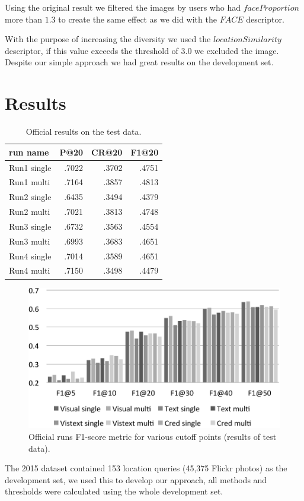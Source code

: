 \documentclass{acm_proc_article-me}
\begin{document}
Using the original result we filtered the images by users who had $faceProportion$ more than $1.3$ to create the same effect as we did with the $FACE$ descriptor.

\pagebreak

With the purpose of increasing the diversity we used the $locationSimilarity$ descriptor, if this value exceeds the threshold of $3.0$ we excluded the image. Despite our simple approach we had great results on the development set.

\section{Results}

\begin{table}[t]
	\centering
\begin{tabular}{|l|r|r|r|}
	\hline 
	run name & P@20 & CR@20 & F1@20\tabularnewline
	\hline 
	\hline 
	Run1 single & .7022 & .3702 & .4751\tabularnewline
	\hline 
	Run1 multi & .7164 & .3857 & .4813\tabularnewline
	\hline 
	Run2 single & .6435 & .3494 & .4379\tabularnewline
	\hline 
	Run2 multi & .7021 & .3813 & .4748\tabularnewline
	\hline 
	Run3 single & .6732 & .3563 & .4554\tabularnewline
	\hline 
	Run3 multi & .6993 & .3683 & .4651\tabularnewline
	\hline 
	Run4 single & .7014 & .3589 & .4651\tabularnewline
	\hline 
	Run4 multi & .7150 & .3498 & .4479\tabularnewline
	\hline
\end{tabular}
\label{table:results}
\caption{Official results on the test data.}
\end{table}

\begin{figure}[t]
\includegraphics[width=1.0\linewidth]{f1}
\caption{Official runs F1-score metric for various cutoff points (results of test data).}
\label{fig:f1}
\end{figure}
The 2015 dataset contained 153 location queries (45,375 Flickr photos) as the development set, we used this to develop our approach, all methods and thresholds were calculated using the whole development set.
\end{document}
